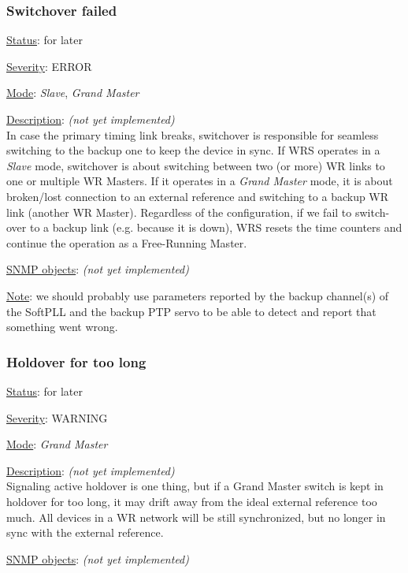 \subsubsection{\bf Switchover failed}
		\begin{pck_descr}
			\item [] \underline{Status}: for later
			\item [] \underline{Severity}: ERROR
			\item [] \underline{Mode}: \emph{Slave}, \emph{Grand Master}
			\item [] \underline{Description}: \emph{(not yet implemented)}\\
				In case the primary timing link breaks, switchover is responsible for
				seamless switching to the backup one to keep the device in sync. If WRS
				operates in a \emph{Slave} mode, switchover is about switching
				between two (or more) WR links to one or multiple WR Masters. If it
				operates in a \emph{Grand Master} mode, it is about broken/lost
				connection to an external reference and switching to a backup WR link
				(another WR Master). Regardless of the configuration, if we fail to
				switch-over to a backup link (e.g. because it is down), WRS resets
				the time counters and continue the operation as a Free-Running Master.
			\item [] \underline{SNMP objects}: \emph{(not yet implemented)}
			\item [] \underline{Note}: we should probably use parameters reported by
				the backup channel(s) of the SoftPLL and the backup PTP servo to be able
				to detect and report that something went wrong.
		\end{pck_descr}

\subsubsection{\bf Holdover for too long}
		\begin{pck_descr}
			\item [] \underline{Status}: for later
			\item [] \underline{Severity}: WARNING
			\item [] \underline{Mode}: \emph{Grand Master}
			\item [] \underline{Description}: \emph{(not yet implemented)}\\
				Signaling active holdover is one thing, but if a Grand Master switch is
				kept in holdover for too long, it may drift away from the ideal external
				reference too much. All devices in a WR network will be still
				synchronized, but no longer in sync with the external reference.
			\item [] \underline{SNMP objects}: \emph{(not yet implemented)}
		\end{pck_descr}


